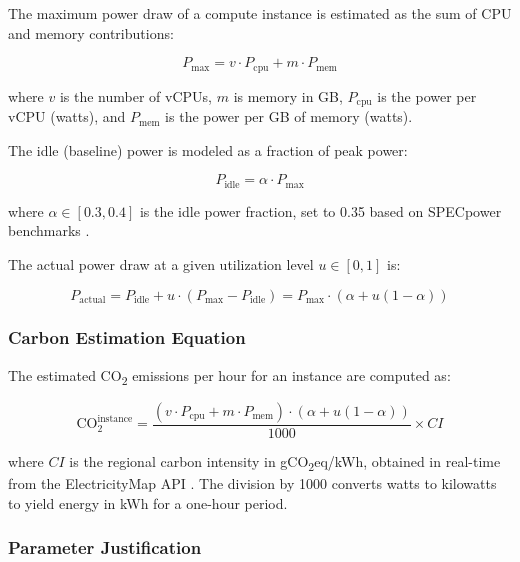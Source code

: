 \documentclass[12pt]{article}
\begin{document}
The maximum power draw of a compute instance is estimated as the sum of CPU and memory contributions:

\begin{equation}
P_{\text{max}} = v \cdot P_{\text{cpu}} + m \cdot P_{\text{mem}}
\label{eq:pmax}
\end{equation}

\noindent where $v$ is the number of vCPUs, $m$ is memory in GB, $P_{\text{cpu}}$ is the power per vCPU (watts), and $P_{\text{mem}}$ is the power per GB of memory (watts).

The idle (baseline) power is modeled as a fraction of peak power:

\begin{equation}
P_{\text{idle}} = \alpha \cdot P_{\text{max}}
\label{eq:pidle}
\end{equation}

\noindent where $\alpha \in [0.3, 0.4]$ is the idle power fraction, set to 0.35 based on SPECpower benchmarks \citep{b12}.

The actual power draw at a given utilization level $u \in [0, 1]$ is:

\begin{equation}
P_{\text{actual}} = P_{\text{idle}} + u \cdot (P_{\text{max}} - P_{\text{idle}}) = P_{\text{max}} \cdot (\alpha + u(1 - \alpha))
\label{eq:pactual}
\end{equation}

\subsubsection{Carbon Estimation Equation}

The estimated CO\textsubscript{2} emissions per hour for an instance are computed as:

\begin{equation}
\text{CO}_{2}^{\text{instance}} = \frac{(v \cdot P_{\text{cpu}} + m \cdot P_{\text{mem}}) \cdot (\alpha + u(1-\alpha))}{1000} \times CI
\label{eq:co2}
\end{equation}

\noindent where $CI$ is the regional carbon intensity in gCO\textsubscript{2}eq/kWh, obtained in real-time from the ElectricityMap API \citep{b9}. The division by 1000 converts watts to kilowatts to yield energy in kWh for a one-hour period.

\subsubsection{Parameter Justification}
\end{document}
